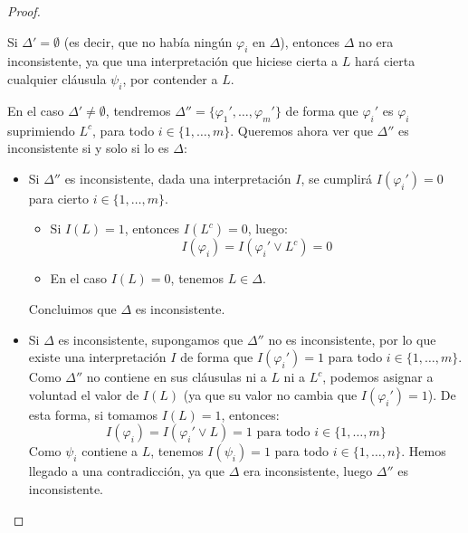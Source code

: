 \begin{teo}
\begin{proof}
\begin{itemize}
                Si $\Delta'=\emptyset $ (es decir, que no había ningún $\varphi_i$ en $\Delta$), entonces $\Delta$ no era inconsistente, ya que una interpretación que hiciese cierta a $L$ hará cierta cualquier cláusula $\psi_i$, por contender a $L$.

                En el caso $\Delta'\neq \emptyset $, tendremos $\Delta '' = \{\varphi_1',\ldots,\varphi_m'\}$ de forma que $\varphi_i'$ es $\varphi_i$ suprimiendo $L^c$, para todo $i \in \{1,\ldots,m\}$. Queremos ahora ver que $\Delta ''$ es inconsistente si y solo si lo es $\Delta$:
                \begin{itemize}
                    \item Si $\Delta''$ es inconsistente, dada una interpretación $I$, se cumplirá $I(\varphi_i')=0$ para cierto $i \in \{1,\ldots,m\}$.
                        \begin{itemize}
                            \item Si $I(L)=1$, entonces $I(L^c)=0$, luego:
                                \begin{equation*}
                                    I(\varphi_i) = I(\varphi_i'\lor L^c) = 0
                                \end{equation*}
                            \item En el caso $I(L)=0$, tenemos $L\in \Delta$.
                        \end{itemize}
                        Concluimos que $\Delta$ es inconsistente.
                    \item Si $\Delta$ es inconsistente, supongamos que $\Delta ''$ no es inconsistente, por lo que existe una interpretación $I$ de forma que $I(\varphi_i')=1$ para todo \newline $i \in \{1,\ldots,m\}$. Como $\Delta ''$ no contiene en sus cláusulas ni a $L$ ni a $L^c$, podemos asignar a voluntad el valor de $I(L)$ (ya que su valor no cambia que $I(\varphi_i')=1$). De esta forma, si tomamos $I(L)=1$, entonces:
                        \begin{equation*}
                            I(\varphi_i) = I(\varphi_i'\lor L) = 1 \text{\ para todo\ } i \in \{1,\ldots,m\}
                        \end{equation*}
                        Como $\psi_i$ contiene a $L$, tenemos $I(\psi_i)=1$ para todo $i \in \{1,\ldots,n\}$. Hemos llegado a una contradicción, ya que $\Delta$ era inconsistente, luego $\Delta ''$ es inconsistente.
                \end{itemize}

\end{itemize}
\end{proof}
\end{teo}
